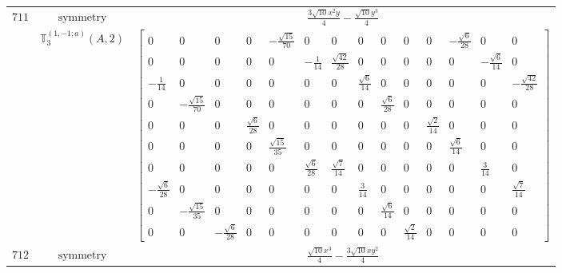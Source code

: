 \documentclass[fleqn,8pt,landscape]{jsarticle}
\begin{document}
\begin{longtable}{ccc}
$ 711 $ & $ \text{symmetry} $ & $ \frac{3 \sqrt{10} x^{2} y}{4} - \frac{\sqrt{10} y^{3}}{4} $ \\
$  $ & $ \mathbb{T}_{3}^{(1,-1;a)}(A,2) $ & $ \begin{bmatrix} 0 & 0 & 0 & 0 & - \frac{\sqrt{15}}{70} & 0 & 0 & 0 & 0 & 0 & 0 & - \frac{\sqrt{6}}{28} & 0 & 0 \\ 0 & 0 & 0 & 0 & 0 & - \frac{1}{14} & \frac{\sqrt{42}}{28} & 0 & 0 & 0 & 0 & 0 & - \frac{\sqrt{6}}{14} & 0 \\ - \frac{1}{14} & 0 & 0 & 0 & 0 & 0 & 0 & \frac{\sqrt{6}}{14} & 0 & 0 & 0 & 0 & 0 & - \frac{\sqrt{42}}{28} \\ 0 & - \frac{\sqrt{15}}{70} & 0 & 0 & 0 & 0 & 0 & 0 & \frac{\sqrt{6}}{28} & 0 & 0 & 0 & 0 & 0 \\ 0 & 0 & 0 & \frac{\sqrt{6}}{28} & 0 & 0 & 0 & 0 & 0 & 0 & \frac{\sqrt{2}}{14} & 0 & 0 & 0 \\ 0 & 0 & 0 & 0 & \frac{\sqrt{15}}{35} & 0 & 0 & 0 & 0 & 0 & 0 & \frac{\sqrt{6}}{14} & 0 & 0 \\ 0 & 0 & 0 & 0 & 0 & \frac{\sqrt{6}}{28} & \frac{\sqrt{7}}{14} & 0 & 0 & 0 & 0 & 0 & \frac{3}{14} & 0 \\ - \frac{\sqrt{6}}{28} & 0 & 0 & 0 & 0 & 0 & 0 & \frac{3}{14} & 0 & 0 & 0 & 0 & 0 & \frac{\sqrt{7}}{14} \\ 0 & - \frac{\sqrt{15}}{35} & 0 & 0 & 0 & 0 & 0 & 0 & \frac{\sqrt{6}}{14} & 0 & 0 & 0 & 0 & 0 \\ 0 & 0 & - \frac{\sqrt{6}}{28} & 0 & 0 & 0 & 0 & 0 & 0 & \frac{\sqrt{2}}{14} & 0 & 0 & 0 & 0 \end{bmatrix} $ \\ \hline
$ 712 $ & $ \text{symmetry} $ & $ \frac{\sqrt{10} x^{3}}{4} - \frac{3 \sqrt{10} x y^{2}}{4} $ \\

\end{longtable}
\end{document}
